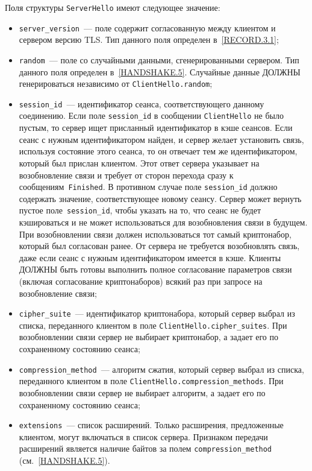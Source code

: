 Поля структуры \lstinline{ServerHello} имеют следующее значение:
\begin{itemize}
\item[--]
\lstinline{server_version}~--- поле содержит согласованную между 
клиентом и сервером версию TLS. Тип данного поля определен в~\ref{RECORD.3.1}; 

\item[--]
\lstinline{random}~--- поле со случайными данными, сгенерированными 
сервером. Тип данного поля определен в~\ref{HANDSHAKE.5}. Случайные данные 
ДОЛЖНЫ генерироваться независимо от \lstinline{ClientHello.random}; 

\item[--]
\lstinline{session_id}~--- идентификатор сеанса, соответствующего 
данному соединению. Если поле \lstinline{session_id} в сообщении 
\lstinline{ClientHello} не было пустым, то сервер ищет присланный 
идентификатор в кэше сеансов. Если сеанс с нужным идентификатором найден, 
и сервер желает установить связь, используя состояние этого сеанса, то он 
отвечает тем же идентификатором, который был прислан клиентом. Этот ответ 
сервера указывает на возобновление связи и требует от сторон 
перехода сразу к сообщениям~\lstinline{Finished}. В противном случае поле 
\lstinline{session_id} должно содержать значение, соответствующее новому 
сеансу. Сервер может вернуть пустое поле~\lstinline{session_id}, чтобы 
указать на то, что сеанс не будет кэшироваться и не может 
использоваться для возобновления связи в будущем. При возобновлении
связи должен использоваться тот самый криптонабор, который был  
согласован ранее. От сервера не требуется возобновлять связь, даже если 
сеанс с нужным идентификатором имеется в кэше. Клиенты ДОЛЖНЫ быть готовы 
выполнить полное согласование параметров связи 
(включая согласование криптонаборов) всякий раз при запросе на 
возобновление связи; 

\item[--]
\lstinline{cipher_suite}~--- идентификатор криптонабора, который 
сервер выбрал из списка, переданного клиентом в поле 
\lstinline{ClientHello.cipher_suites}. При возобновлении связи сервер не 
выбирает криптонабор, а задает его по сохраненному состоянию сеанса; 
 
\item[--]
\lstinline{compression_method}~--- алгоритм сжатия, который сервер 
выбрал из списка, переданного клиентом в поле 
\lstinline{ClientHello.compression_methods}. При возобновлении связи 
сервер не выбирает алгоритм, а задает его по сохраненному состоянию 
сеанса; 

\item[--]
\lstinline{extensions}~--- список расширений. Только расширения, 
предложенные клиентом, могут включаться в список сервера. Признаком 
передачи расширений является наличие байтов за полем 
\lstinline{compression_method} (см.~\ref{HANDSHAKE.5}). 
\end{itemize}

